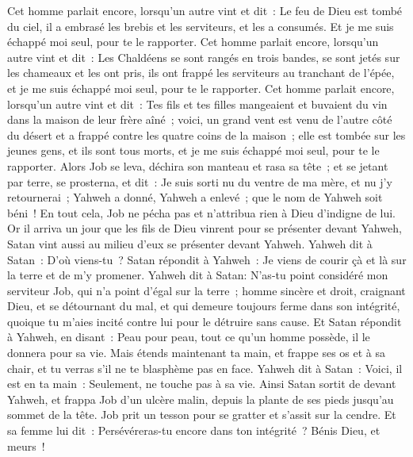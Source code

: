 \begin{multicols}{2}
Cet homme parlait encore, lorsqu'un autre vint et dit~: Le feu de Dieu est tombé du ciel, il a embrasé les brebis et les serviteurs, et les a consumés. Et je me suis échappé moi seul, pour te le rapporter.
Cet homme parlait encore, lorsqu'un autre vint et dit~: Les Chaldéens se sont rangés en trois bandes, se sont jetés sur les chameaux et les ont pris, ils ont frappé les serviteurs au tranchant de l'épée, et je me suis échappé moi seul, pour te le rapporter.
Cet homme parlait encore, lorsqu'un autre vint et dit~: Tes fils et tes filles mangeaient et buvaient du vin dans la maison de leur frère aîné~;
voici, un grand vent est venu de l'autre côté du désert et a frappé contre les quatre coins de la maison~; elle est tombée sur les jeunes gens, et ils sont tous morts, et je me suis échappé moi seul, pour te le rapporter.
Alors Job se leva, déchira son manteau et rasa sa tête~; et se jetant par terre, se prosterna,
et dit~: Je suis sorti nu du ventre de ma mère, et nu j'y retournerai~; Yahweh a donné, Yahweh a enlevé~; que le nom de Yahweh soit béni~!
En tout cela, Job ne pécha pas et n'attribua rien à Dieu d'indigne de lui.
\VerseOne{}Or il arriva un jour que les fils de Dieu vinrent pour se présenter devant Yahweh, Satan vint aussi au milieu d'eux se présenter devant Yahweh.
Yahweh dit à Satan~: D'où viens-tu~? Satan répondit à Yahweh~: Je viens de courir çà et là sur la terre et de m'y promener.
Yahweh dit à Satan: N'as-tu point considéré mon serviteur Job, qui n'a point d'égal sur la terre~; homme sincère et droit, craignant Dieu, et se détournant du mal, et qui demeure toujours ferme dans son intégrité, quoique tu m'aies incité contre lui pour le détruire sans cause.
Et Satan répondit à Yahweh, en disant~: Peau pour peau, tout ce qu'un homme possède, il le donnera pour sa vie.
Mais étends maintenant ta main, et frappe ses os et à sa chair, et tu verras s'il ne te blasphème pas en face.
Yahweh dit à Satan~: Voici, il est en ta main~: Seulement, ne touche pas à sa vie.
Ainsi Satan sortit de devant Yahweh, et frappa Job d'un ulcère malin, depuis la plante de ses pieds jusqu'au sommet de la tête.
Job prit un tesson pour se gratter et s'assit sur la cendre.
Et sa femme lui dit~: Persévéreras-tu encore dans ton intégrité~? Bénis Dieu, et meurs~!

\end{multicols}
